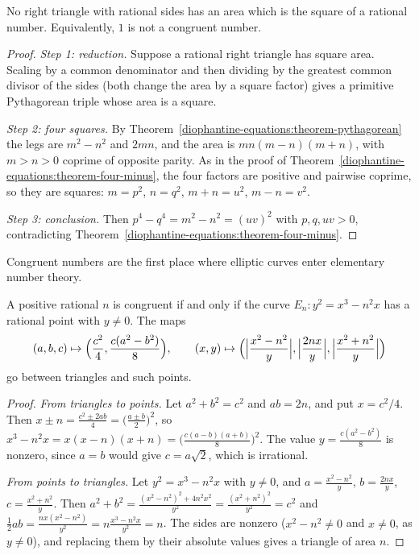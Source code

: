 \begin{theorem}\label{diophantine-equations:theorem-right-triangle}
No right triangle with rational sides has an area which is the square of a rational number. Equivalently, $1$ is not a congruent number.
\end{theorem}

\begin{proof}
\emph{Step 1: reduction.} Suppose a rational right triangle has square area. Scaling by a common denominator and then dividing by the greatest common divisor of the sides (both change the area by a square
factor) gives a primitive Pythagorean triple whose area is a square.

\emph{Step 2: four squares.} By Theorem~\ref{diophantine-equations:theorem-pythagorean} the legs are $m^2 - n^2$ and $2mn$, and the area is $mn(m - n)(m + n)$, with $m > n > 0$ coprime of opposite parity. As in
the proof of Theorem~\ref{diophantine-equations:theorem-four-minus}, the four factors are positive and pairwise coprime, so they are squares: $m = p^2$, $n = q^2$, $m + n = u^2$, $m - n = v^2$.

\emph{Step 3: conclusion.} Then $p^4 - q^4 = m^2 - n^2 = (uv)^2$ with $p, q, uv > 0$, contradicting Theorem~\ref{diophantine-equations:theorem-four-minus}.
\end{proof}

Congruent numbers are the first place where elliptic curves enter elementary number theory.

\begin{proposition}\label{diophantine-equations:proposition-congruent-curve}
A positive rational $n$ is congruent if and only if the curve $E_n : y^2 = x^3 - n^2x$ has a rational point with $y \neq 0$. The maps
\[
(a, b, c) \mapsto \Bigl(\frac{c^2}{4}, \frac{c(a^2 - b^2)}{8}\Bigr), \qquad (x, y) \mapsto \Bigl(\Bigl|\frac{x^2 - n^2}{y}\Bigr|, \Bigl|\frac{2nx}{y}\Bigr|, \Bigl|\frac{x^2 + n^2}{y}\Bigr|\Bigr)
\]
go between triangles and such points.
\end{proposition}

\begin{proof}
\emph{From triangles to points.} Let $a^2 + b^2 = c^2$ and $ab = 2n$, and put $x = c^2/4$. Then $x \pm n = \frac{c^2 \pm 2ab}{4} = \bigl(\frac{a \pm b}{2}\bigr)^2$, so
$x^3 - n^2x = x(x - n)(x + n) = \bigl(\frac{c(a - b)(a + b)}{8}\bigr)^2$. The value $y = \frac{c(a^2 - b^2)}{8}$ is nonzero, since $a = b$ would give $c = a\sqrt2$, which is irrational.

\emph{From points to triangles.} Let $y^2 = x^3 - n^2x$ with $y \neq 0$, and $a = \frac{x^2 - n^2}{y}$, $b = \frac{2nx}{y}$, $c = \frac{x^2 + n^2}{y}$. Then
$a^2 + b^2 = \frac{(x^2 - n^2)^2 + 4n^2x^2}{y^2} = \frac{(x^2 + n^2)^2}{y^2} = c^2$ and $\frac12ab = \frac{nx(x^2 - n^2)}{y^2} = n\frac{x^3 - n^2x}{y^2} = n$. The sides are nonzero ($x^2 - n^2 \neq 0$ and
$x \neq 0$, as $y \neq 0$), and replacing them by their absolute values gives a triangle of area $n$.
\end{proof}

